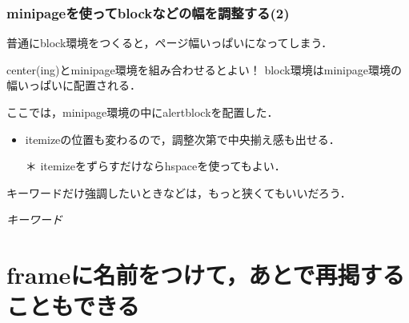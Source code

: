 \documentclass[unicode, 9pt, aspectratio=169]{beamer}
\begin{document}
\begin{frame}
\frametitle{minipageを使ってblockなどの幅を調整する(2)}
\centering
\begin{block}{}
    \centering
    普通にblock環境をつくると，ページ幅いっぱいになってしまう．
\end{block}

\begin{minipage}{.8\linewidth}
    \begin{alertblock}{center(ing)とminipage環境を組み合わせるとよい！}
    \centering
    block環境はminipage環境の幅いっぱいに配置される．

    ここでは，minipage環境の中にalertblockを配置した．
    \end{alertblock}

    \begin{itemize}
        \item itemizeの位置も変わるので，調整次第で中央揃え感も出せる．
        \item[＊] itemizeをずらすだけならhspaceを使ってもよい．
    \end{itemize}
\end{minipage}

キーワードだけ強調したいときなどは，もっと狭くてもいいだろう．
\begin{minipage}{.5\linewidth}
    \begin{exampleblock}{}
        \centering
        \Large \emph{キーワード}
    \end{exampleblock}
\end{minipage}
\end{frame}

\section{frameに名前をつけて，あとで再掲することもできる}
\end{document}
